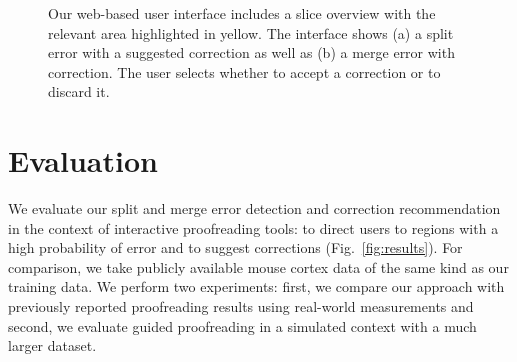 \begin{figure}[hb]
 \centering
    \hfill
	\caption{Our web-based user interface includes a slice overview with the relevant area highlighted in yellow. The interface shows (a) a split error with a suggested correction as well as (b) a merge error with correction. The user selects whether to accept a correction or to discard it.}
\label{fig:prototype}
\end{figure}

\section{Evaluation}
\label{sec:evaluation}




We evaluate our split and merge error detection and correction recommendation in the context of interactive proofreading tools: to direct users to regions with a high probability of error and to suggest corrections (Fig.~\ref{fig:results}). For comparison, we take publicly available mouse cortex data of the same kind as our training data. We perform two experiments: first, we compare our approach with previously reported proofreading results using real-world measurements and second, we evaluate guided proofreading in a simulated context with a much larger dataset.

